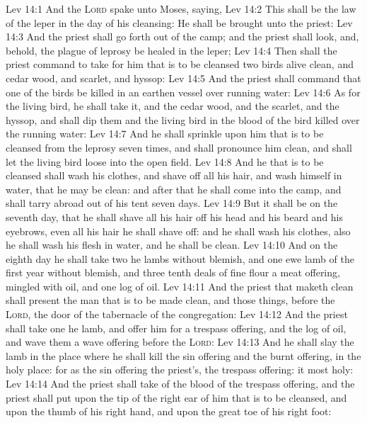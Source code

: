 \vs Lev 14:1 And the \textsc{Lord} spake unto Moses, saying,
\vs Lev 14:2 This shall be the law of the leper in the day of his cleansing: He shall be brought unto the priest:
\vs Lev 14:3 And the priest shall go forth out of the camp; and the priest shall look, and, behold,  the plague of leprosy be healed in the leper;
\vs Lev 14:4 Then shall the priest command to take for him that is to be cleansed two birds alive  clean, and cedar wood, and scarlet, and hyssop:
\vs Lev 14:5 And the priest shall command that one of the birds be killed in an earthen vessel over running water:
\vs Lev 14:6 As for the living bird, he shall take it, and the cedar wood, and the scarlet, and the hyssop, and shall dip them and the living bird in the blood of the bird  killed over the running water:
\vs Lev 14:7 And he shall sprinkle upon him that is to be cleansed from the leprosy seven times, and shall pronounce him clean, and shall let the living bird loose into the open field.
\vs Lev 14:8 And he that is to be cleansed shall wash his clothes, and shave off all his hair, and wash himself in water, that he may be clean: and after that he shall come into the camp, and shall tarry abroad out of his tent seven days.
\vs Lev 14:9 But it shall be on the seventh day, that he shall shave all his hair off his head and his beard and his eyebrows, even all his hair he shall shave off: and he shall wash his clothes, also he shall wash his flesh in water, and he shall be clean.
\vs Lev 14:10 And on the eighth day he shall take two he lambs without blemish, and one ewe lamb of the first year without blemish, and three tenth deals of fine flour  a meat offering, mingled with oil, and one log of oil.
\vs Lev 14:11 And the priest that maketh  clean shall present the man that is to be made clean, and those things, before the \textsc{Lord},  the door of the tabernacle of the congregation:
\vs Lev 14:12 And the priest shall take one he lamb, and offer him for a trespass offering, and the log of oil, and wave them  a wave offering before the \textsc{Lord}:
\vs Lev 14:13 And he shall slay the lamb in the place where he shall kill the sin offering and the burnt offering, in the holy place: for as the sin offering  the priest's,  the trespass offering: it  most holy:
\vs Lev 14:14 And the priest shall take  of the blood of the trespass offering, and the priest shall put  upon the tip of the right ear of him that is to be cleansed, and upon the thumb of his right hand, and upon the great toe of his right foot:
